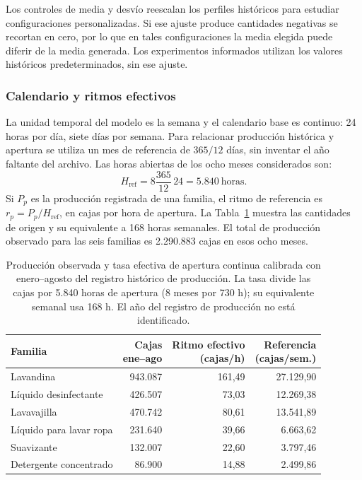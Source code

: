 \documentclass[11pt, a4paper]{article}
\begin{document}
Los controles de media y desvío reescalan los perfiles históricos para estudiar configuraciones personalizadas. Si ese ajuste produce cantidades negativas se recortan en cero, por lo que en tales configuraciones la media elegida puede diferir de la media generada. Los experimentos informados utilizan los valores históricos predeterminados, sin ese ajuste.

\subsubsection{Calendario y ritmos efectivos}
La unidad temporal del modelo es la semana y el calendario base es continuo: 24 horas por día, siete días por semana. Para relacionar producción histórica y apertura se utiliza un mes de referencia de $365/12$ días, sin inventar el año faltante del archivo. Las horas abiertas de los ocho meses considerados son:
\begin{equation}
    H_{\text{ref}}=8\frac{365}{12}\,24=5.840\ \text{horas}.
\end{equation}
Si $P_p$ es la producción registrada de una familia, el ritmo de referencia es $r_p=P_p/H_{\text{ref}}$, en cajas por hora de apertura. La Tabla~\ref{tab:produccion_calibrada} muestra las cantidades de origen y su equivalente a 168 horas semanales. El total de producción observado para las seis familias es 2.290.883 cajas en esos ocho meses.

\begin{table}[htbp]
\centering
\caption{Producción observada y tasa efectiva de apertura continua calibrada con enero--agosto del registro histórico de producción. La tasa divide las cajas por 5.840 horas de apertura (8 meses por 730 h); su equivalente semanal usa 168 h. El año del registro de producción no está identificado.}
\label{tab:produccion_calibrada}
\small
\begin{tabularx}{\textwidth}{Xrrr}
\toprule
Familia & \shortstack[r]{Cajas\\ene--ago} & \shortstack[r]{Ritmo efectivo\\(cajas/h)} & \shortstack[r]{Referencia\\(cajas/sem.)} \\
\midrule
Lavandina & 943.087 & 161,49 & 27.129,90 \\
Líquido desinfectante & 426.507 & 73,03 & 12.269,38 \\
Lavavajilla & 470.742 & 80,61 & 13.541,89 \\
Líquido para lavar ropa & 231.640 & 39,66 & 6.663,62 \\
Suavizante & 132.007 & 22,60 & 3.797,46 \\
Detergente concentrado & 86.900 & 14,88 & 2.499,86 \\
\bottomrule
\end{tabularx}
\end{table}
\end{document}
